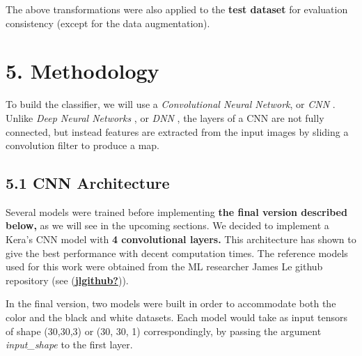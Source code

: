 \documentclass[
  11pt,
]{article}
\begin{document}
The above transformations were also applied to the \textbf{test dataset}
for evaluation consistency (except for the data augmentation).

\pagebreak

\hypertarget{methodology}{%
\section{5. Methodology}\label{methodology}}

To build the classifier, we will use a \emph{Convolutional Neural
Network}, or \emph{CNN} . Unlike \emph{Deep Neural Networks} , or
\emph{DNN} , the layers of a CNN are not fully connected, but instead
features are extracted from the input images by sliding a convolution
filter to produce a map.

\hypertarget{cnn-architecture}{%
\subsection{5.1 CNN Architecture}\label{cnn-architecture}}

Several models were trained before implementing \textbf{the final
version described below,} as we will see in the upcoming sections. We
decided to implement a Kera's CNN model with \textbf{4 convolutional
layers.} This architecture has shown to give the best performance with
decent computation times. The reference models used for this work were
obtained from the ML researcher James Le github repository (see
(\protect\hyperlink{ref-jlgithub}{\textbf{jlgithub?}})).

In the final version, two models were built in order to accommodate both
the color and the black and white datasets. Each model would take as
input tensors of shape (30,30,3) or (30, 30, 1) correspondingly, by
passing the argument \emph{input\_shape} to the first layer.
\end{document}
